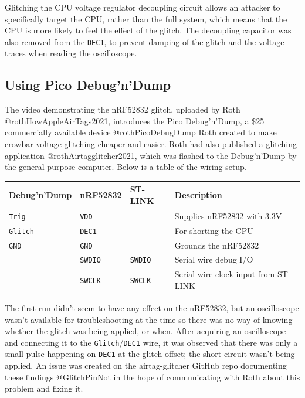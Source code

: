 Glitching the CPU voltage regulator decoupling circuit allows an
attacker to specifically target the CPU, rather than the full system,
which means that the CPU is more likely to feel the effect of the
glitch. The decoupling capacitor was also removed from the
\texttt{DEC1}, to prevent damping of the glitch and the voltage traces
when reading the oscilloscope.

\hypertarget{using-pico-debugndump}{%
\subsection{\texorpdfstring{Using Pico
Debug'n'Dump\label{section_nrf52832_debugndump}}{Using Pico Debug'n'Dump}}\label{using-pico-debugndump}}

The video demonstrating the nRF52832 glitch, uploaded by Roth
@rothHowAppleAirTags2021, introduces the Pico Debug'n'Dump, a \$25
commercially available device @rothPicoDebugDump Roth created to make
crowbar voltage glitching cheaper and easier. Roth had also published a
glitching application @rothAirtagglitcher2021, which was flashed to the
Debug'n'Dump by the general purpose computer. Below is a table of the
wiring setup.

\begin{longtable}[]{@{}llll@{}}
\toprule
Debug'n'Dump & nRF52832 & ST-LINK & Description \\
\midrule
\endhead
\texttt{Trig} & \texttt{VDD} & & Supplies nRF52832 with 3.3V \\
\texttt{Glitch} & \texttt{DEC1} & & For shorting the CPU \\
\texttt{GND} & \texttt{GND} & & Grounds the nRF52832 \\
& \texttt{SWDIO} & \texttt{SWDIO} & Serial wire debug I/O \\
& \texttt{SWCLK} & \texttt{SWCLK} & Serial wire clock input from
ST-LINK \\
\bottomrule
\end{longtable}

The first run didn't seem to have any effect on the nRF52832, but an
oscilloscope wasn't available for troubleshooting at the time so there
was no way of knowing whether the glitch was being applied, or when.
After acquiring an oscilloscope and connecting it to the
\texttt{Glitch}/\texttt{DEC1} wire, it was observed that there was only
a small pulse happening on \texttt{DEC1} at the glitch offset; the short
circuit wasn't being applied. An issue was created on the
airtag-glitcher GitHub repo documenting these findings @GlitchPinNot in
the hope of communicating with Roth about this problem and fixing it.

